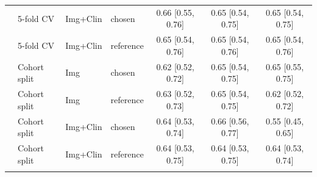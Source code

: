 \begin{tabular}{@{}llllccc@{}}
 & 5-fold CV & Img+Clin & chosen & 0.66 [0.55, 0.76] & 0.65 [0.54, 0.75] & 0.65 [0.54, 0.75] \\
 & 5-fold CV & Img+Clin & reference & 0.65 [0.54, 0.76] & 0.65 [0.54, 0.76] & 0.65 [0.54, 0.76] \\
 & Cohort split & Img & chosen & 0.62 [0.52, 0.72] & 0.65 [0.54, 0.75] & 0.65 [0.55, 0.75] \\
 & Cohort split & Img & reference & 0.63 [0.52, 0.73] & 0.65 [0.54, 0.75] & 0.62 [0.52, 0.72] \\
 & Cohort split & Img+Clin & chosen & 0.64 [0.53, 0.74] & 0.66 [0.56, 0.77] & 0.55 [0.45, 0.65] \\
 & Cohort split & Img+Clin & reference & 0.64 [0.53, 0.75] & 0.64 [0.53, 0.75] & 0.64 [0.53, 0.74] \\
\botrule
\end{tabular}
